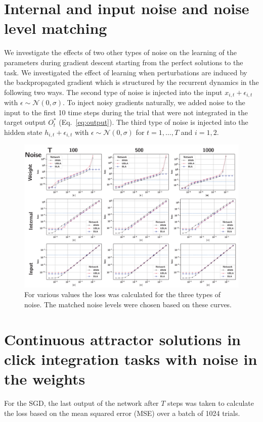 \documentclass{article} %
\newcounter{ct}
\theoremstyle{definition}
\theoremstyle{remark}
\begin{document}
\newpage
\section{Internal and input noise and noise level matching}\label{sec:supp:matching}


We investigate the effects of two other types of noise on the learning of the parameters during gradient descent starting from the perfect solutions to the task.
We investigated the effect of learning when perturbations are induced by the backpropagated gradient which is structured by the recurrent dynamics in the following two ways.
The second type of noise is injected into the input $x_{i,t}+\epsilon_{i,t}$ with $\epsilon\sim\mathcal{N}(0,\sigma)$.
To inject noisy gradients naturally, we added noise to the input to the first 10 time steps during the trial that were not integrated in the target output $O_t^*$ (Eq.~\ref{eq:output}).
The third type of noise is injected into the hidden state $h_{i,t}+\epsilon_{i,t}$ with $\epsilon\sim\mathcal{N}(0,\sigma)$ for $t=1,\dots, T$ and $i=1,2$. 

\begin{figure}[thbp]
     \centering
    \includegraphics[width=\textwidth]{matching_noise_3types_cont}
       \caption{For various values the loss was calculated for the three types of noise. The matched noise levels were chosen based on these curves.}
         \label{fig:matching_noise_3types_cont}
\end{figure}

\newpage
\section{Continuous attractor solutions in click integration tasks with noise in the weights}
For the SGD, the last output of the network after $T$ steps was taken to calculate the loss based on the mean squared error (MSE) over a batch of 1024 trials. 
\end{document}
